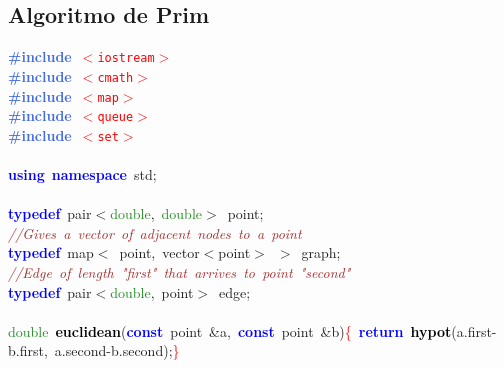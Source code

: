 \documentclass[10pt,a4paper,twoside]{article}
\begin{document}
{{{{\subsection{Algoritmo de Prim}
{\ttfamily \raggedright {
\noindent
\mbox{}\textbf{\textcolor{RoyalBlue}{\#include}}\ \texttt{\textcolor{Red}{$<$iostream$>$}} \\
\mbox{}\textbf{\textcolor{RoyalBlue}{\#include}}\ \texttt{\textcolor{Red}{$<$cmath$>$}} \\
\mbox{}\textbf{\textcolor{RoyalBlue}{\#include}}\ \texttt{\textcolor{Red}{$<$map$>$}} \\
\mbox{}\textbf{\textcolor{RoyalBlue}{\#include}}\ \texttt{\textcolor{Red}{$<$queue$>$}} \\
\mbox{}\textbf{\textcolor{RoyalBlue}{\#include}}\ \texttt{\textcolor{Red}{$<$set$>$}} \\
\mbox{} \\
\mbox{}\textbf{\textcolor{Blue}{using}}\ \textbf{\textcolor{Blue}{namespace}}\ std\textcolor{BrickRed}{;} \\
\mbox{} \\
\mbox{}\textbf{\textcolor{Blue}{typedef}}\ pair\textcolor{BrickRed}{$<$}\textcolor{ForestGreen}{double}\textcolor{BrickRed}{,}\ \textcolor{ForestGreen}{double}\textcolor{BrickRed}{$>$}\ point\textcolor{BrickRed}{;} \\
\mbox{}\textit{\textcolor{Brown}{//Gives\ a\ vector\ of\ adjacent\ nodes\ to\ a\ point}} \\
\mbox{}\textbf{\textcolor{Blue}{typedef}}\ map\textcolor{BrickRed}{$<$}\ point\textcolor{BrickRed}{,}\ vector\textcolor{BrickRed}{$<$}point\textcolor{BrickRed}{$>$}\ \textcolor{BrickRed}{$>$}\ graph\textcolor{BrickRed}{;} \\
\mbox{}\textit{\textcolor{Brown}{//Edge\ of\ length\ "{}first"{}\ that\ arrives\ to\ point\ "{}second"{}}} \\
\mbox{}\textbf{\textcolor{Blue}{typedef}}\ pair\textcolor{BrickRed}{$<$}\textcolor{ForestGreen}{double}\textcolor{BrickRed}{,}\ point\textcolor{BrickRed}{$>$}\ edge\textcolor{BrickRed}{;}\  \\
\mbox{} \\
\mbox{}\textcolor{ForestGreen}{double}\ \textbf{\textcolor{Black}{euclidean}}\textcolor{BrickRed}{(}\textbf{\textcolor{Blue}{const}}\ point\ \textcolor{BrickRed}{\&}a\textcolor{BrickRed}{,}\ \textbf{\textcolor{Blue}{const}}\ point\ \textcolor{BrickRed}{\&}b\textcolor{BrickRed}{)}\textcolor{Red}{\{}\ \textbf{\textcolor{Blue}{return}}\ \textbf{\textcolor{Black}{hypot}}\textcolor{BrickRed}{(}a\textcolor{BrickRed}{.}first\textcolor{BrickRed}{-}b\textcolor{BrickRed}{.}first\textcolor{BrickRed}{,}\ a\textcolor{BrickRed}{.}second\textcolor{BrickRed}{-}b\textcolor{BrickRed}{.}second\textcolor{BrickRed}{);}\textcolor{Red}{\}} \\
}}}}}}
\end{document}
